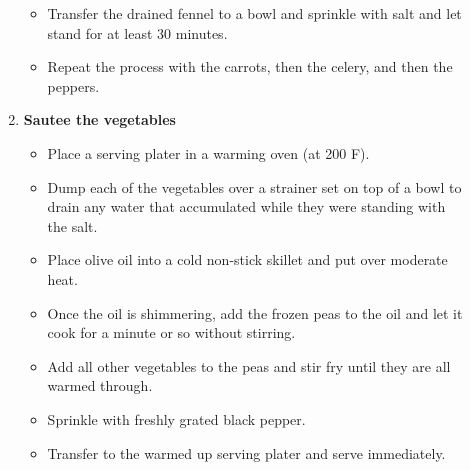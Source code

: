 \documentclass[11pt,letterpaper]{article}
\begin{document}
\begin{description}
\begin{enumerate}
\begin{itemize}
	\item Transfer the drained fennel to a bowl and sprinkle with salt and let stand for at least 30 minutes.
	\item Repeat the process with the carrots, then the celery, and then the peppers.
	\end{itemize}
	\item {\bf Sautee the vegetables}
	\begin{itemize}
	\item Place a serving plater in a warming oven (at 200 F).
	\item Dump each of the vegetables over a strainer set on top of a bowl to drain any water that accumulated while they were standing with the salt.
	\item Place olive oil into a cold non-stick skillet and put over moderate heat.
	\item Once the oil is shimmering, add the frozen peas to the oil and let it cook for a minute or so without stirring.
	\item Add all other vegetables to the peas and stir fry until they are all warmed through.
	\item Sprinkle with freshly grated black pepper.
	\item Transfer to the warmed up serving plater and serve immediately.
	\end{itemize}
	\end{enumerate}
\end{description}
\end{document}
